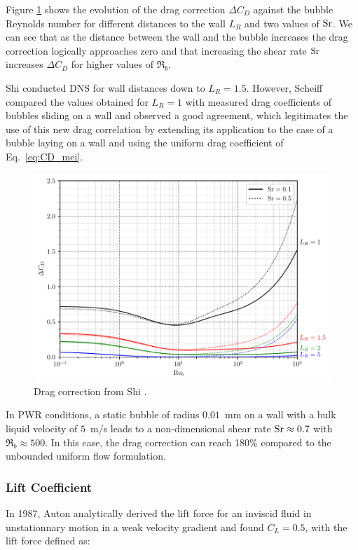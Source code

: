 Figure \ref{fig:CD_shi} shows the evolution of the drag correction $\Delta C_{D}$ against the bubble Reynolds number for different distances to the wall $L_{R}$ and two values of $\mathrm{Sr}$.  We can see that as the distance between the wall and the bubble increases the drag correction logically approaches zero and that increasing the shear rate $\mathrm{Sr}$ increases $\Delta C_{D}$ for higher values of $\Re_{b}$.

\npar

Shi \etal \cite{shi_drag_2021} conducted DNS for wall distances down to $L_{R}=1.5$. However, Scheiff \etal \cite{scheiff_experimental_2021} compared the values obtained for $L_{R}=1$  with measured drag coefficients of bubbles sliding on a wall and observed a good agreement, which legitimates the use of this new drag correlation by extending its application to the case of a bubble laying on a wall and using the uniform drag coefficient of Eq.~\ref{eq:CD_mei}.


\begin{figure}[h!]
\centering
\includegraphics[width=0.6\linewidth]{img/forces/corr_drag.pdf}
\caption{Drag correction from Shi \etal \cite{shi_drag_2021}.}
\label{fig:CD_shi}
\end{figure}


\begin{remark*}{}
In PWR conditions, a static bubble of radius $0.01$\ mm on a wall with a bulk liquid velocity of $5$\ m/s leads to a non-dimensional shear rate $\mathrm{Sr} \approx 0.7$ with $\Re_{b} \approx 500$. In this case, the drag correction can reach 180\% compared to the unbounded uniform flow formulation.
\end{remark*}


\subsubsection{Lift Coefficient}


In 1987, Auton \etal \cite{auton_1998} analytically derived the lift force for an inviscid fluid in unstationnary motion in a weak velocity gradient and found $C_{L}=0.5$, with the lift force defined as:

